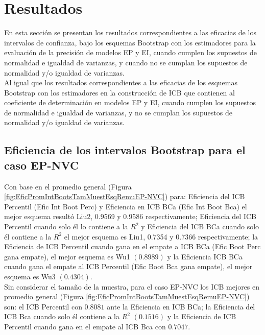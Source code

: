 \section{Resultados}
En esta sección se presentan los resultados correspondientes a las eficacias de los intervalos de confianza, bajo los esquemas Bootstrap con los estimadores para la evaluación de la precisión de modelos EP y EI, cuando cumplen los supuestos de normalidad e igualdad de varianzas, y cuando no se cumplan los supuestos de normalidad y/o igualdad de varianzas.\\

Al igual que los resultados correspondientes a las eficacias de los esquemas Bootstrap con los estimadores en la construcción de ICB que contienen al coeficiente de determinación en modelos EP y EI, cuando cumplen los supuestos de normalidad e igualdad de varianzas, y no se cumplan los supuestos de normalidad y/o igualdad de varianzas.\\



\subsection{Eficiencia de los intervalos Bootstrap para el caso EP-NVC}
Con base en el promedio general (Figura \ref{fig:EficPromIntBootsTamMuestEsqRemuEP-NVC}) para: Eficiencia del ICB Percentil (Efic Int Boot Perc) y Eficiencia en ICB BCa (Efic Int Boot Bca) el mejor esquema resultó Liu2, 0.9569 y 0.9586 respectivamente;
Eficiencia del ICB Percentil cuando solo él lo contiene a la $R^{2}$ y Eficiencia del ICB BCa cuando solo él contiene a la $R^{2}$ el mejor esquema es Liu1, 0.7354 y 0.7366 respectivamente;
la Eficiencia de ICB Percentil cuando gana en el empate a ICB BCa (Efic Boot Perc gana empate), el mejor esquema es Wu1 $(0.8989)$ y la Eficiencia ICB BCa cuando gana el empate al ICB Percentil (Efic Boot Bca gana empate), el mejor esquema es Wu3 $(0.4304)$.\\

Sin considerar el tamaño de la muestra, para el caso EP-NVC los ICB mejores en promedio general (Figura \ref{fig:EficPromIntBootsTamMuestEsqRemuEP-NVC}) son: el ICB Percentil con $0.8081$ ante la Eficiencia en ICB BCa; la Eficiencia del ICB Bca cuando solo él contiene a la $R^{2}$ $(0.1516)$ y la Eficiencia de ICB Percentil cuando gana en el empate al ICB Bca con $0.7047$.


